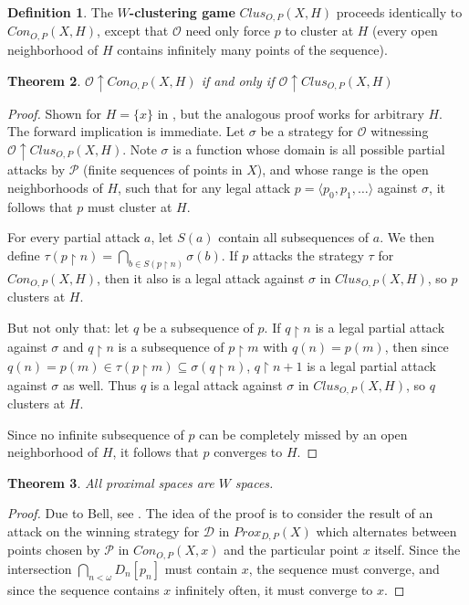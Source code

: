 \documentclass{amsart}
\newtheorem{thm}{Theorem}[section]
\theoremstyle{definition}
\newtheorem{defn}[thm]{Definition}
\theoremstyle{remark}
\newcommand{\<}{\langle}
\renewcommand{\>}{\rangle}
\newcommand{\proxgame}[1]{Prox_{D,P}(#1)}
\newcommand{\congame}[2]{Con_{O,P}(#1,#2)}
\newcommand{\clusgame}[2]{Clus_{O,P}(#1,#2)}
\newcommand{\pl}[1]{\mathscr{#1}}
\newcommand{\win}{\uparrow}
\newcommand{\rest}{\restriction}
\begin{document}
\begin{defn}
  The \textbf{$W$-clustering game} $\clusgame{X}{H}$ proceeds identically to $\congame{X}{H}$, except that $\pl O$ need only force $p$ to cluster at $H$ (every open neighborhood of $H$ contains infinitely many points of the sequence).
\end{defn}

\begin{thm}
  $\pl O\win\congame{X}{H}$ if and only if $\pl O \win\clusgame{X}{H}$
\end{thm}

\begin{proof}
  Shown for $H=\{x\}$ in \cite{ginfinite}, but the analogous proof works for arbitrary $H$. The forward implication is immediate. Let $\sigma$ be a strategy for $\pl O$ witnessing $\pl O\win \clusgame{X}{H}$. Note $\sigma$ is a function whose domain is all possible partial attacks by $\pl P$ (finite sequences of points in $X$), and whose range is the open neighborhoods of $H$, such that for any legal attack $p=\<p_0,p_1,\dots\>$ against $\sigma$, it follows that $p$ must cluster at $H$.

  For every partial attack $a$, let $S(a)$ contain all subsequences of $a$. We then define $\tau(p\rest n)=\bigcap_{b\in S(p\rest n)}\sigma(b)$. If $p$ attacks the strategy $\tau$ for $\congame{X}{H}$, then it also is a legal attack against $\sigma$ in $\clusgame{X}{H}$, so $p$ clusters at $H$. 

  But not only that: let $q$ be a subsequence of $p$. If $q\rest n$ is a legal partial attack against $\sigma$ and $q\rest n$ is a subsequence of $p\rest m$ with $q(n)=p(m)$, then since $q(n)=p(m)\in\tau(p\rest m)\subseteq\sigma(q\rest n)$, $q\rest n+1$ is a legal partial attack against $\sigma$ as well. Thus $q$ is a legal attack against $\sigma$ in $\clusgame{X}{H}$, so $q$ clusters at $H$.

  Since no infinite subsequence of $p$ can be completely missed by an open neighborhood of $H$, it follows that $p$ converges to $H$.
\end{proof}

\begin{thm}
  All proximal spaces are $W$ spaces.
\end{thm}

\begin{proof}
  Due to Bell, see \cite{b}. The idea of the proof is to consider the result of an attack on the winning strategy for $\pl D$ in $\proxgame{X}$ which alternates between points chosen by $\pl P$ in $\congame{X}{x}$ and the particular point $x$ itself. Since the intersection $\bigcap_{n<\omega} D_n[p_n]$ must contain $x$, the sequence must converge, and since the sequence contains $x$ infinitely often, it must converge to $x$.
\end{proof}
\end{document}
